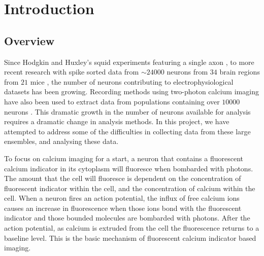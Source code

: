 \chapter{Introduction}

\label{chap:intro}

\section{Overview}

Since Hodgkin and Huxley's squid experiments featuring a single axon \parencite{hodgkin}, to more recent research with spike sorted data from  $\sim 24000$ neurons from $34$ brain regions from $21$ mice \parencite{allen}, the number of neurons contributing to electrophysiological datasets has been growing. Recording methods using two-photon calcium imaging have also been used to extract data from populations containing over $10000$ neurons \parencite{peron}. This dramatic growth in the number of neurons available for analysis requires a dramatic change in analysis methods. In this project, we have attempted to address some of the difficulties in collecting data from these large ensembles, and analysing these data.

To focus on calcium imaging for a start, a neuron that contains a fluorescent calcium indicator in its cytoplasm will fluoresce when bombarded with photons. The amount that the cell will fluoresce is dependent on the concentration of fluorescent indicator within the cell, and the concentration of calcium within the cell. When a neuron fires an action potential, the influx of free calcium ions causes an increase in fluorescence when those ions bond with the fluorescent indicator and those bounded molecules are bombarded with photons. After the action potential, as calcium is extruded from the cell the fluorescence returns to a baseline level. This is the basic mechanism of fluorescent calcium indicator based imaging.

